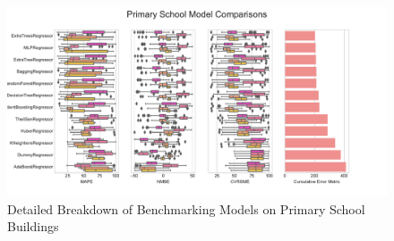 \documentclass[preprint,12pt]{elsarticle}
\begin{document}
\begin{figure}[ht!]
\begin{center}
\includegraphics[width=1\columnwidth]{figures/PrimClass_boxplot.pdf}
\caption{Detailed Breakdown of Benchmarking Models on Primary School Buildings}
\label{fig:prim}%
\end{center}
\end{figure}
\end{document}

